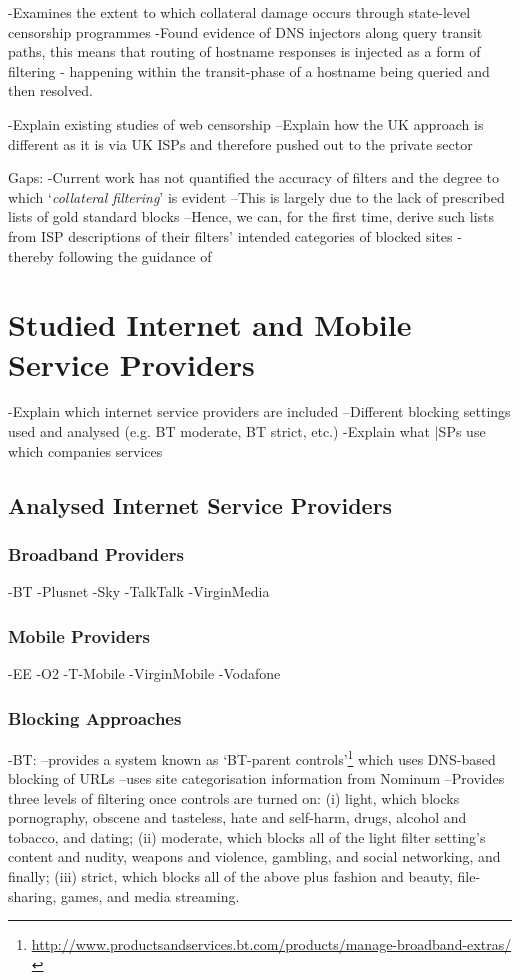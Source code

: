 \documentclass{bmcart}
\begin{document}
\cite{Anonymous:2012:CDI:2317307.2317311}
-Examines the extent to which collateral damage occurs through state-level censorship programmes
-Found evidence of DNS injectors along query transit paths, this means that routing of hostname responses is injected as a form of filtering - happening within the transit-phase of a hostname being queried and then resolved.


-Explain existing studies of web censorship
--Explain how the UK approach is different as it is via UK ISPs and therefore pushed out to the private sector

Gaps:
-Current work has not quantified the accuracy of filters and the degree to which `\textit{collateral filtering}' is evident
--This is largely due to the lack of prescribed lists of gold standard blocks
--Hence, we can, for the first time, derive such lists from ISP descriptions of their filters' intended categories of blocked sites - thereby following the guidance of \cite{crete2013not}



\clearpage
\section*{Studied Internet and Mobile Service Providers}
-Explain which internet service providers are included
--Different blocking settings used and analysed (e.g. BT moderate, BT strict, etc.)
-Explain what |SPs use which companies services

\subsection*{Analysed Internet Service Providers}

\subsubsection*{Broadband Providers}
-BT
-Plusnet
-Sky
-TalkTalk
-VirginMedia

\subsubsection*{Mobile Providers}
-EE
-O2
-T-Mobile
-VirginMobile
-Vodafone

\subsubsection*{Blocking Approaches}
-BT: 
--provides a system known as `BT-parent controls'\footnote{\url{http://www.productsandservices.bt.com/products/manage-broadband-extras/}} which uses DNS-based blocking of URLs
--uses site categorisation information from Nominum
--Provides three levels of filtering once controls are turned on: (i) light, which blocks pornography, obscene and tasteless, hate and self-harm, drugs, alcohol and tobacco, and dating; (ii) moderate, which blocks all of the light filter setting's content and nudity, weapons and violence, gambling, and social networking, and finally; (iii) strict, which blocks all of the above plus fashion and beauty, file-sharing, games, and media streaming.
\end{document}
